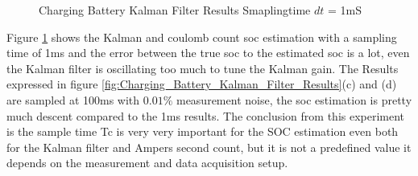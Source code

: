 \begin{figure}[h]
	\centering
	\qquad
	\caption{Charging Battery Kalman Filter Results Smaplingtime $dt$ = 1mS}
	\label{fig:Charging_Battery_Kalman_Filter_Results_SamplingTime_1mS}
\end{figure}

Figure \ref{fig:Charging_Battery_Kalman_Filter_Results_SamplingTime_1mS} shows the Kalman and coulomb count soc estimation with a sampling time of 1ms and the error between the true soc to the estimated soc is a lot, even the Kalman filter is oscillating too much to tune the Kalman gain. The Results expressed in figure \ref{fig:Charging_Battery_Kalman_Filter_Results}(c) and (d) are sampled at 100ms with $0.01\%$ measurement noise, the soc estimation is pretty much descent compared to the 1ms results.
The conclusion from this experiment is the sample time Tc is very very important for the SOC estimation even both for the Kalman filter and Ampers second count, but it is not a predefined value it depends on the measurement and data acquisition setup.

